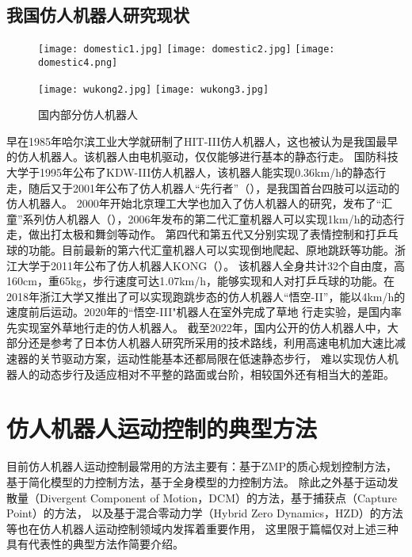 \subsection{我国仿人机器人研究现状}
\begin{figure}[htbp]
    \centering
        {%
            \texttt{[image: domestic1.jpg]}}
        {%
            \texttt{[image: domestic2.jpg]}}
        {%
            \texttt{[image: domestic4.png]}}     
    
        {%
            \texttt{[image: wukong2.jpg]}}
        {%
            \texttt{[image: wukong3.jpg]}}            
    \caption{国内部分仿人机器人\label{fig:domes_biped}}
\end{figure}
早在1985年哈尔滨工业大学就研制了HIT-III仿人机器人，这也被认为是我国最早的仿人机器人\cite{谢涛2002}。该机器人由电机驱动，仅仅能够进行基本的静态行走。
国防科技大学于1995年公布了KDW-III仿人机器人，该机器人能实现0.36km/h的静态行走，随后又于2001年公布了仿人机器人“先行者”（），是我国首台四肢可以运动的仿人机器人。
2000年开始北京理工大学也加入了仿人机器人的研究，发布了“汇童”系列仿人机器人（），2006年发布的第二代汇童机器人可以实现1km/h的动态行走，做出打太极和舞剑等动作。
第四代和第五代又分别实现了表情控制和打乒乓球的功能。目前最新的第六代汇童机器人可以实现倒地爬起、原地跳跃等功能\cite{huang2019historical}。浙江大学于2011年公布了仿人机器人KONG\cite{sun2011balance}（）。
该机器人全身共计32个自由度，高160cm，重65kg，步行速度可达1.07km/h，能够实现和人对打乒乓球的功能。在2018年浙江大学又推出了可以实现跑跳步态的仿人机器人“悟空-II”，能以4km/h的速度前后运动。2020年的“悟空-III"机器人在室外完成了草地
行走实验，是国内率先实现室外草地行走的仿人机器人。
截至2022年，国内公开的仿人机器人中，大部分还是参考了日本仿人机器人研究所采用的技术路线，利用高速电机加大速比减速器的关节驱动方案，运动性能基本还都局限在低速静态步行，
难以实现仿人机器人的动态步行及适应相对不平整的路面或台阶，相较国外还有相当大的差距。
\section{仿人机器人运动控制的典型方法}
目前仿人机器人运动控制最常用的方法主要有：基于ZMP的质心规划控制方法，基于简化模型的力控制方法，基于全身模型的力控制方法。
除此之外基于运动发散量（Divergent Component of Motion，DCM）的方法\cite{mesesan2019dynamic}，基于捕获点（Capture Point）的方法\cite{koolen2012capturability}，
以及基于混合零动力学（Hybrid Zero Dynamics，HZD）的方法\cite{hereid2019rapid}等也在仿人机器人运动控制领域内发挥着重要作用，
这里限于篇幅仅对上述三种具有代表性的典型方法作简要介绍。
